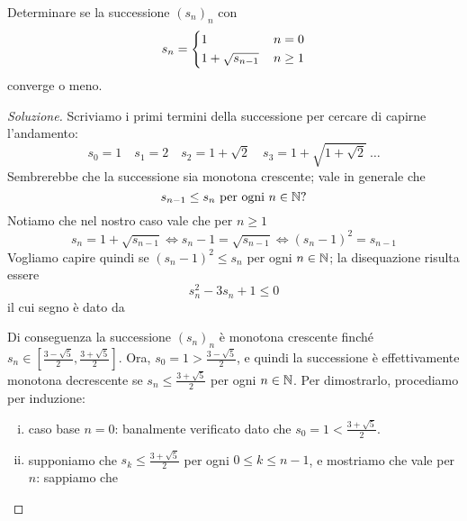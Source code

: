 \begin{exercise}
    \label{ex:4.8}
    Determinare se la successione $(s_n)_n$ con
    \[
    s_n = \begin{dcases}
        1\, & n=0\\
        1+\sqrt{s_{n-1}}\, & n\ge 1
    \end{dcases}
    \]
    converge o meno.
\end{exercise}
\begin{proof}[Soluzione]
    Scriviamo i primi termini della successione per cercare di capirne l'andamento:
    \[
    s_0 = 1 \quad s_1 = 2 \quad s_2 = 1+\sqrt{2} \quad s_3 = 1+ \sqrt{1+\sqrt{2}} \ \dots
    \]
    Sembrerebbe che la successione sia monotona crescente; vale in generale che
    \[
    s_{n-1}\le s_n \ \text{per ogni} \ n\in\amsbb{N} \text{?}
    \]
    Notiamo che nel nostro caso vale che per $n\ge 1$
    \[
    s_n = 1 +\sqrt{s_{n-1}} \iff s_n-1 = \sqrt{s_{n-1}} \iff (s_n-1)^2 = s_{n-1}
    \]
    Vogliamo capire quindi se $(s_n-1)^2 \le s_n$ per ogni $n\in\amsbb{N}$; la disequazione risulta essere
    \[
    s_n^2 -3s_n +1 \le 0
    \]
    il cui segno è dato da
    \begin{center}
        \end{center}
        Di conseguenza la successione $(s_n)_n$ è monotona crescente finché $s_n\in\left[\frac{3-\sqrt{5}}{2}, \frac{3+\sqrt{5}}{2}\right]$. Ora, $s_0 = 1 > \frac{3-\sqrt{5}}{2}$, e quindi la successione è effettivamente monotona decrescente se $s_n\le \frac{3+\sqrt{5}}{2}$ per ogni $n\in\amsbb{N}$. Per dimostrarlo, procediamo per induzione:
        \begin{enumerate}[(i)]
            \item caso base $n=0$: banalmente verificato dato che $s_0 = 1 < \frac{3+\sqrt{5}}{2}$.
            \item supponiamo che $s_k\le \frac{3+\sqrt{5}}{2}$ per ogni $0\le k \le n-1$, e mostriamo che vale per $n$: sappiamo che 

\end{enumerate}
\end{proof}
